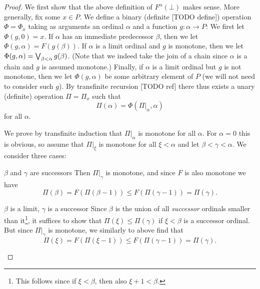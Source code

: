 \documentclass[a4paper, 11pt, article, danish, oneside]{memoir}
\DeclareMathOperator*{\smallbigvee}{\textstyle\bigvee}
\DeclareMathOperator*{\bigjoin}{\mathchoice
    {\smallbigvee}%
    {\bigvee}%
    {\bigvee}%
    {\bigvee}%
}
\begin{document}
\begin{proof}
    We first show that the above definition of $F^\alpha(\bot)$ makes sense. More generally, fix some $x \in P$. We define a binary (definite [TODO define]) operation $\Phi = \Phi_x$ taking as arguments an ordinal $\alpha$ and a function $g \colon \alpha \to P$: We first let $\Phi(g,0) = x$. If $\alpha$ has an immediate predecessor $\beta$, then we let $\Phi(g,\alpha) = F(g(\beta))$. If $\alpha$ is a limit ordinal and $g$ is monotone, then we let $\Phi(g,\alpha) = \bigjoin_{\beta < \alpha} g(\beta)$. (Note that we indeed take the join of a chain since $\alpha$ is a chain and $g$ is assumed monotone.) Finally, if $\alpha$ is a limit ordinal but $g$ is not monotone, then we let $\Phi(g,\alpha)$ be some arbitrary element of $P$ (we will not need to consider such $g$). By transfinite recursion [TODO ref] there thus exists a unary (definite) operation $\Pi = \Pi_x$ such that
    \begin{equation*}
        \Pi(\alpha)
            = \Phi(\Pi|_\alpha, \alpha)
    \end{equation*}
    for all $\alpha$.
    
    We prove by transfinite induction that $\Pi|_\alpha$ is monotone for all $\alpha$. For $\alpha = 0$ this is obvious, so assume that $\Pi|_\xi$ is monotone for all $\xi < \alpha$ and let $\beta < \gamma < \alpha$. We consider three cases:
    \begin{proofsec}
        \item[$\beta$ and $\gamma$ are successors]
        Then $\Pi|_\gamma$ is monotone, and since $F$ is also monotone we have
        \begin{equation*}
            \Pi(\beta)
                = F(\Pi(\beta-1))
                \leq F(\Pi(\gamma-1))
                = \Pi(\gamma).
        \end{equation*}

        \item[$\beta$ is a limit, $\gamma$ is a successor]
        Since $\beta$ is the union of all \emph{successor} ordinals smaller than it\footnote{This follows since if $\xi < \beta$, then also $\xi + 1 < \beta$.}, it suffices to show that $\Pi(\xi) \leq \Pi(\gamma)$ if $\xi < \beta$ is a successor ordinal. But since $\Pi|_\gamma$ is monotone, we similarly to above find that
        \begin{equation*}
            \Pi(\xi)
                = F(\Pi(\xi-1))
                \leq F(\Pi(\gamma-1))
                = \Pi(\gamma).
        \end{equation*}


\end{proofsec}
\end{proof}
\end{document}
